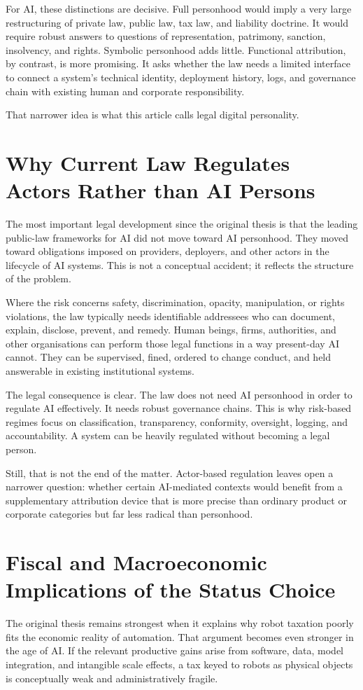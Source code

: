 \documentclass[11pt]{article}
\begin{document}
For AI, these distinctions are decisive. Full personhood would imply a very large restructuring of private law, public law, tax law, and liability doctrine. It would require robust answers to questions of representation, patrimony, sanction, insolvency, and rights. Symbolic personhood adds little. Functional attribution, by contrast, is more promising. It asks whether the law needs a limited interface to connect a system's technical identity, deployment history, logs, and governance chain with existing human and corporate responsibility.

That narrower idea is what this article calls legal digital personality.

\section{Why Current Law Regulates Actors Rather than AI Persons}
The most important legal development since the original thesis is that the leading public-law frameworks for AI did not move toward AI personhood. They moved toward obligations imposed on providers, deployers, and other actors in the lifecycle of AI systems. This is not a conceptual accident; it reflects the structure of the problem.

Where the risk concerns safety, discrimination, opacity, manipulation, or rights violations, the law typically needs identifiable addressees who can document, explain, disclose, prevent, and remedy. Human beings, firms, authorities, and other organisations can perform those legal functions in a way present-day AI cannot. They can be supervised, fined, ordered to change conduct, and held answerable in existing institutional systems.

The legal consequence is clear. The law does not need AI personhood in order to regulate AI effectively. It needs robust governance chains. This is why risk-based regimes focus on classification, transparency, conformity, oversight, logging, and accountability. A system can be heavily regulated without becoming a legal person.

Still, that is not the end of the matter. Actor-based regulation leaves open a narrower question: whether certain AI-mediated contexts would benefit from a supplementary attribution device that is more precise than ordinary product or corporate categories but far less radical than personhood.

\section{Fiscal and Macroeconomic Implications of the Status Choice}
The original thesis remains strongest when it explains why robot taxation poorly fits the economic reality of automation. That argument becomes even stronger in the age of AI. If the relevant productive gains arise from software, data, model integration, and intangible scale effects, a tax keyed to robots as physical objects is conceptually weak and administratively fragile.
\end{document}
